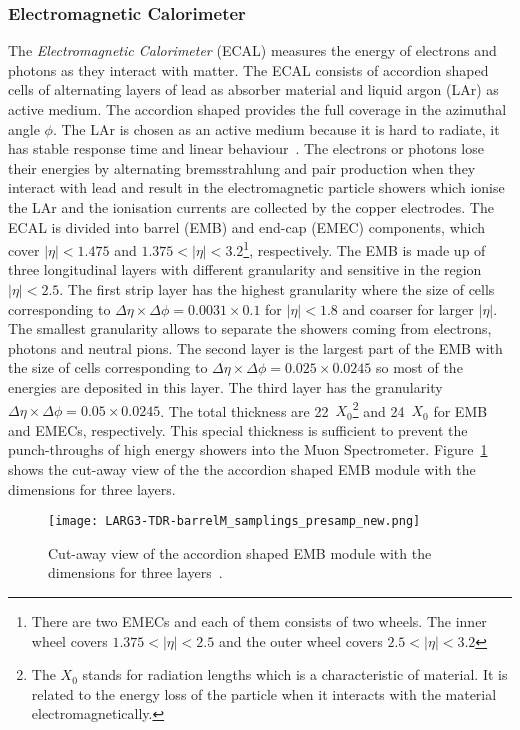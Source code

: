\subsubsection{Electromagnetic Calorimeter}
\label{subsubsec:ae_ecal}
The \textit{Electromagnetic Calorimeter} (ECAL) measures the energy of electrons and photons as they interact with matter.
The ECAL consists of accordion shaped cells of alternating layers of lead as absorber material and liquid argon (LAr) as active medium.
The accordion shaped provides the full coverage in the azimuthal angle $\phi$.
The LAr is chosen as an active medium because it is hard to radiate, it has stable response time and linear behaviour~\cite{1748-0221-3-08-S08003}.
The electrons or photons lose their energies by alternating bremsstrahlung and pair production when they interact with lead and result in the electromagnetic particle showers which ionise the LAr and the ionisation currents are collected by the copper electrodes.
The ECAL is divided into barrel (EMB) and end-cap (EMEC) components, which cover $|\eta| < 1.475$ and $1.375 < |\eta| < 3.2$\footnote{There are two EMECs and each of them consists of two wheels. The inner wheel covers $1.375 < |\eta| < 2.5$ and the outer wheel covers $2.5 < |\eta| < 3.2$}, respectively.
The EMB is made up of three longitudinal layers with different granularity and sensitive in the region $|\eta| < 2.5$.
The first strip layer has the highest granularity where the size of cells corresponding to $\Delta \eta \times \Delta \phi = 0.0031 \times 0.1$ for $|\eta| < 1.8$ and coarser for larger $|\eta|$.
The smallest granularity allows to separate the showers coming from electrons, photons and neutral pions.
The second layer is the largest part of the EMB with the size of cells corresponding to $\Delta \eta \times \Delta \phi = 0.025 \times 0.0245$ so most of the energies are deposited in this layer.
The third layer has the granularity $\Delta \eta \times \Delta \phi = 0.05 \times 0.0245$.
The total thickness are 22~$X_{0}$\footnote{The $X_{0}$ stands for radiation lengths which is a characteristic of material. It is related to the energy loss of the particle when it interacts with the material electromagnetically.} and 24~$X_{0}$ for EMB and EMECs, respectively.
This special thickness is sufficient to prevent the punch-throughs of high energy showers into the Muon Spectrometer.
Figure~\ref{fig:ae_ecal} shows the cut-away view of the the accordion shaped EMB module with the dimensions for three layers.

\begin{figure}[htbp]
\begin{center}
\texttt{[image: LARG3-TDR-barrelM\_samplings\_presamp\_new.png]}
\caption{Cut-away view of the accordion shaped EMB module with the dimensions for three layers~\cite{Nikiforou:2013nba}.}
\label{fig:ae_ecal}
\end{center}
\end{figure}


